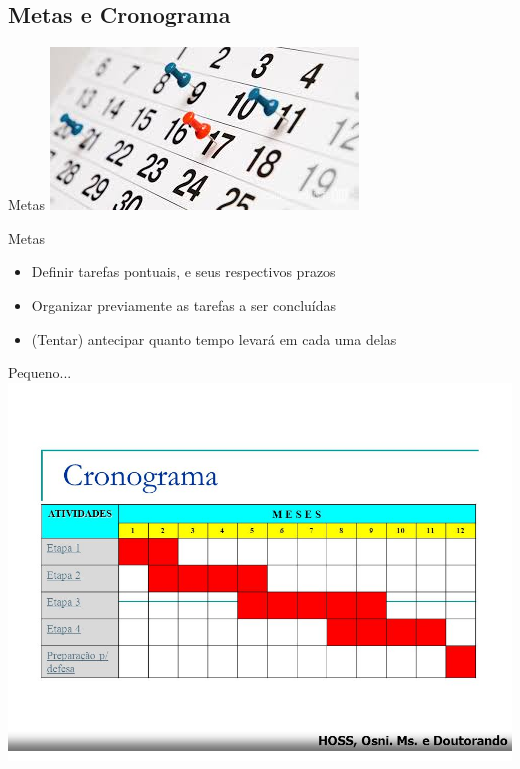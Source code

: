 \documentclass{beamer}
\begin{document}
\subsection{Metas e Cronograma}

\begin{frame}{Metas}
  \includegraphics[width=\textwidth]{Etapas/metas}
\end{frame}

\begin{frame}{Metas}
  \begin{itemize}
  \item Definir tarefas pontuais, e seus respectivos prazos
  \item Organizar previamente as tarefas a ser concluídas
  \item (Tentar) antecipar quanto tempo levará em cada uma delas
  \end{itemize}
\end{frame}

\begin{frame}{Pequeno...}
  \includegraphics[width=\textwidth]{Etapas/cronograma-1}
\end{frame}
\end{document}
